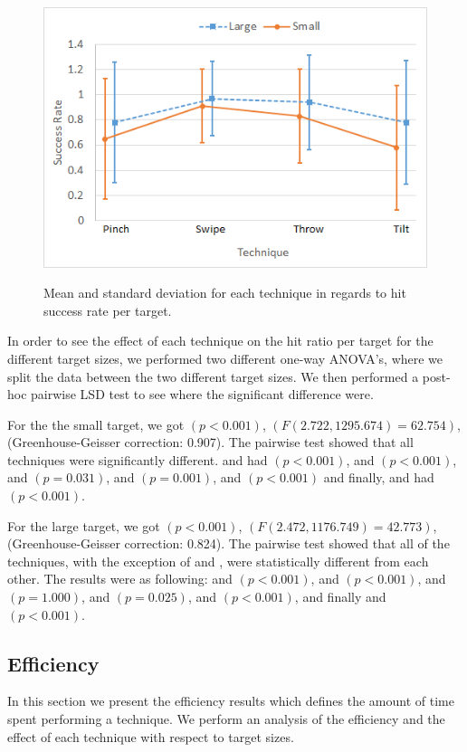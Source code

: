 \begin{figure}[H]
	{\includegraphics[width = 1\columnwidth ]{images/success.png}} 
	\caption{
		Mean and standard deviation for each technique in regards to hit success rate per target.
	}
	\label{fig:successResults}
\end{figure}

In order to see the effect of each technique on the hit ratio per target for the different target sizes, we performed two different one-way ANOVA's, where we split the data between the two different target sizes.
We then performed a post-hoc pairwise LSD test to see where the significant difference were.
 
For the the small target, we got $(p<0.001)$, $(F(2.722, 1295.674)=62.754)$, (Greenhouse-Geisser correction: 0.907).
The pairwise test showed that all techniques were significantly different. \pinch and \swipe had $(p < 0.001)$, \pinch and \throw $(p <0.001)$, \pinch and \tilt $(p = 0.031)$, \swipe and \throw $(p=0.001)$, \swipe and \tilt $(p < 0.001)$ and finally, \throw and \tilt had $(p<0.001)$. 

For the large target, we got $(p<0.001)$, $(F(2.472, 1176.749)=42.773)$, (Greenhouse-Geisser correction: 0.824).
The pairwise test showed that all of the techniques, with the exception of \pinch and \tilt, were statistically different from each other. The results were as following: \pinch and \swipe $(p<0.001)$, \pinch and \throw $(p<0.001)$, \pinch and \tilt $(p=1.000)$, \swipe and \throw $(p=0.025)$, \swipe and \tilt $(p<0.001)$, and finally \throw and \tilt $(p<0.001)$.

\subsection{Efficiency}
In this section we present the efficiency results which defines the amount of time spent performing a technique.
We perform an analysis of the efficiency and the effect of each technique with respect to target sizes.


